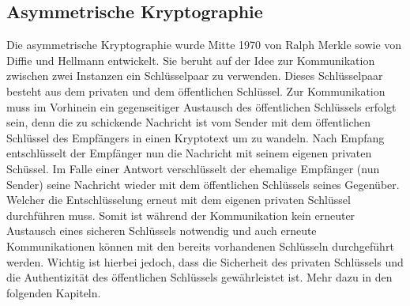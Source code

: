 \documentclass[paper=a4,11pt,german]{scrartcl} %
\begin{document}
\subsection{Asymmetrische Kryptographie}
Die asymmetrische Kryptographie wurde Mitte 1970 von Ralph Merkle sowie von Diffie und Hellmann entwickelt. Sie beruht auf der Idee zur Kommunikation zwischen zwei Instanzen ein Schlüsselpaar zu verwenden. Dieses Schlüsselpaar besteht aus dem privaten und dem öffentlichen Schlüssel. Zur Kommunikation muss im Vorhinein ein gegenseitiger Austausch des öffentlichen Schlüssels erfolgt sein, denn die zu schickende Nachricht ist vom Sender mit dem öffentlichen Schlüssel des Empfängers in einen Kryptotext um zu wandeln. Nach Empfang entschlüsselt der Empfänger nun die Nachricht mit seinem eigenen privaten Schüssel. Im Falle einer Antwort verschlüsselt der ehemalige Empfänger (nun Sender) seine Nachricht wieder mit dem öffentlichen Schlüssels seines Gegenüber. Welcher die Entschlüsselung erneut mit dem eigenen privaten Schlüssel durchführen muss. Somit ist während der Kommunikation kein erneuter Austausch eines sicheren Schlüssels notwendig und auch erneute Kommunikationen können mit den bereits vorhandenen Schlüsseln durchgeführt werden. Wichtig ist hierbei jedoch, dass die Sicherheit des privaten Schlüssels und die Authentizität des öffentlichen Schlüssels gewährleistet ist. Mehr dazu in den folgenden Kapiteln.
\newpage
\end{document}
